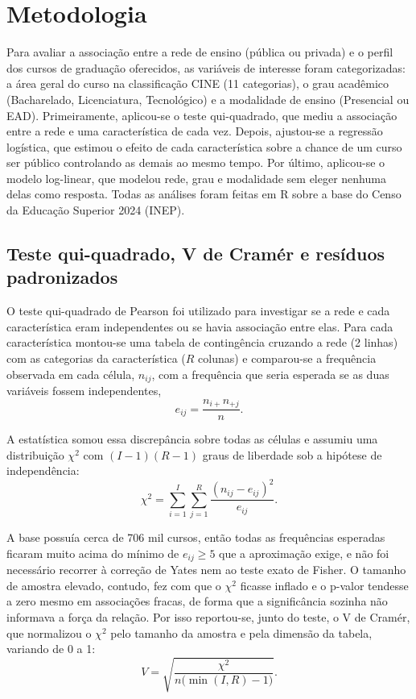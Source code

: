 \documentclass[12pt]{article}
\begin{document}
\section{Metodologia}
Para avaliar a associação entre a rede de ensino (pública ou privada) e o perfil dos cursos de graduação oferecidos, as variáveis de interesse foram categorizadas: a área geral do curso na classificação CINE (11 categorias), o grau acadêmico (Bacharelado, Licenciatura, Tecnológico) e a modalidade de ensino (Presencial ou EAD).  Primeiramente, aplicou-se o teste qui-quadrado, que mediu a associação entre a rede e uma característica de cada vez. Depois, ajustou-se a regressão logística, que estimou o efeito de cada característica sobre a chance de um curso ser público controlando as demais ao mesmo tempo. Por último, aplicou-se o modelo log-linear, que modelou rede, grau e modalidade sem eleger nenhuma delas como resposta. Todas as análises foram feitas em R sobre a base do Censo da Educação Superior 2024 (INEP).

\subsection{Teste qui-quadrado, V de Cramér e resíduos padronizados}
O teste qui-quadrado de Pearson foi utilizado para investigar se a rede e cada característica eram independentes ou se havia associação entre elas. Para cada característica montou-se uma tabela de contingência cruzando a rede (2 linhas) com as categorias da característica ($R$ colunas) e comparou-se a frequência observada em cada célula, $n_{ij}$, com a frequência que seria esperada se as duas variáveis fossem independentes,
\begin{equation}
e_{ij} = \frac{n_{i+}n_{+j}}{n}.
\end{equation}

A estatística somou essa discrepância sobre todas as células e assumiu uma distribuição $\chi^2$ com $(I-1)(R-1)$ graus de liberdade sob a hipótese de independência:
\begin{equation}
\chi^2 = \sum_{i=1}^{I}\sum_{j=1}^{R} \frac{(n_{ij}-e_{ij})^2}{e_{ij}}.
\end{equation}

A base possuía cerca de 706 mil cursos, então todas as frequências esperadas ficaram muito acima do mínimo de $e_{ij} \ge 5$ que a aproximação exige, e não foi necessário recorrer à correção de Yates nem ao teste exato de Fisher. O tamanho de amostra elevado, contudo, fez com que o $\chi^2$ ficasse inflado e o p-valor tendesse a zero mesmo em associações fracas, de forma que a significância sozinha não informava a força da relação. Por isso reportou-se, junto do teste, o V de Cramér, que normalizou o $\chi^2$ pelo tamanho da amostra e pela dimensão da tabela, variando de 0 a 1:
\begin{equation}
V = \sqrt{\frac{\chi^2}{n\bigl(\min(I,R)-1\bigr)}}.
\end{equation}
\end{document}
